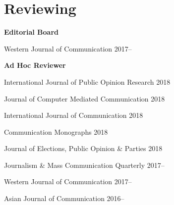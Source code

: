 \section{Reviewing}

  \textbf{Editorial Board}
    \begin{innerlist}
      \item Western Journal of Communication \hfill 2017--
    \end{innerlist}\vspace{1em}

  \textbf{Ad Hoc Reviewer}
    \begin{innerlist}
      \item International Journal of Public Opinion Research \hfill 2018
      \item Journal of Computer Mediated Communication \hfill 2018
      \item International Journal of Communication \hfill 2018
      \item Communication Monographs \hfill 2018
      \item Journal of Elections, Public Opinion \& Parties \hfill 2018
      \item Journalism \& Mass Communication Quarterly \hfill 2017--
      \item Western Journal of Communication \hfill 2017--
      \item Asian Journal of Communication \hfill 2016--
    \end{innerlist}\vspace{-.075in}
